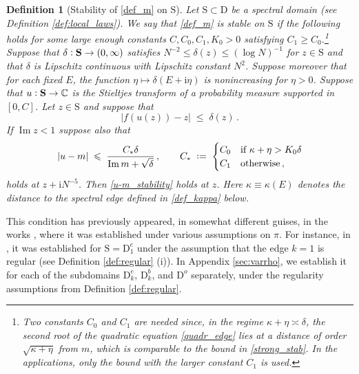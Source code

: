 \documentclass[11pt]{article} %
\numberwithin{equation}{section}
\numberwithin{figure}{section}
\theoremstyle{plain} %
\newtheorem{definition}[theorem]{Definition}
\theoremstyle{definition} %
\newcommand{\f}[1]{\boldsymbol{\mathrm{#1}}} %
\newcommand{\C}{\mathbb{C}}
\newcommand{\ii}{\mathrm{i}}
\newcommand{\col}{\mathrel{\vcenter{\baselineskip0.75ex \lineskiplimit0pt \hbox{.}\hbox{.}}}}
\newcommand*{\deq}{\mathrel{\vcenter{\baselineskip0.65ex \lineskiplimit0pt \hbox{.}\hbox{.}}}=}
\renewcommand{\leq}{\leqslant}
\renewcommand{\geq}{\geqslant}
\newcommand{\abs}[1]{\lvert #1 \rvert}
\newcommand{\absb}[1]{\bigl\lvert #1 \bigr\rvert}
\DeclareMathOperator{\im}{Im}
\begin{document}
\begin{definition}[Stability of \eqref{def_m} on $\f S$] \label{def:stability}
Let $\f S \subset \f D$ be a spectral domain (see Definition \ref{def:local_laws}). We say that \eqref{def_m} is \emph{stable on} $\f S$ if the following holds for some large enough constants $C, C_0, C_1, K_0 > 0$ satisfying $C_1 \geq C_0$.\footnote{Two constants $C_0$ and $C_1$ are needed since, in the regime $\kappa + \eta \asymp \delta$, the second root of the quadratic equation \eqref{quadr_edge} lies at a distance of order $\sqrt{\kappa + \eta}$ from $m$, which is comparable to the bound in \eqref{strong_stab}. In the applications, only the bound with the larger constant $C_1$ is used.}
Suppose that $\delta \col \f S \to (0,\infty)$ satisfies $N^{-2} \leq \delta(z) \leq (\log N)^{-1}$ for $z \in \f S$ and that $\delta$ is Lipschitz continuous with Lipschitz constant $N^2$. Suppose moreover that for each fixed $E$, the function $\eta \mapsto \delta(E + \ii \eta)$ is nonincreasing for $\eta > 0$. Suppose that $u \col \f S \to \C$ is the Stieltjes transform of a probability measure supported in $[0,C]$. Let $z \in \f S$ and suppose that
\begin{equation*}
\absb{f(u(z)) - z} \;\leq\; \delta(z)\,.
\end{equation*}
If $\im z < 1$ suppose also that
\begin{equation} \label{u-m_stability}
\abs{u - m} \;\leq\; \frac{C_* \delta}{\im m +  \sqrt{\delta}}\,, \qquad C_* \;\deq\;
\begin{cases}
C_0 & \text{if } \kappa + \eta > K_0 \delta
\\
C_1 & \text{otherwise}\,,
\end{cases}
\end{equation}
holds at $z + \ii N^{-5}$. Then \eqref{u-m_stability} holds at $z$. Here $\kappa \equiv \kappa(E)$ denotes the distance to the spectral edge defined in \eqref{def_kappa} below.
\end{definition}


This condition has previously appeared, in somewhat different guises, in the works \cite{PY, BEKYY, BaoPanZhou}, where it was established under various assumptions on $\pi$. For instance, in \cite{BaoPanZhou}, it was established for $\f S = \f D^e_1$ under the assumption that the edge $k = 1$ is regular (see Definition \ref{def:regular} (i)).
In Appendix \ref{sec:varrho}, we establish it for each of the subdomains $\f D^e_k$, $\f D^b_k$, and $\f D^o$ separately, under the regularity assumptions from Definition \ref{def:regular}.
\end{document}
